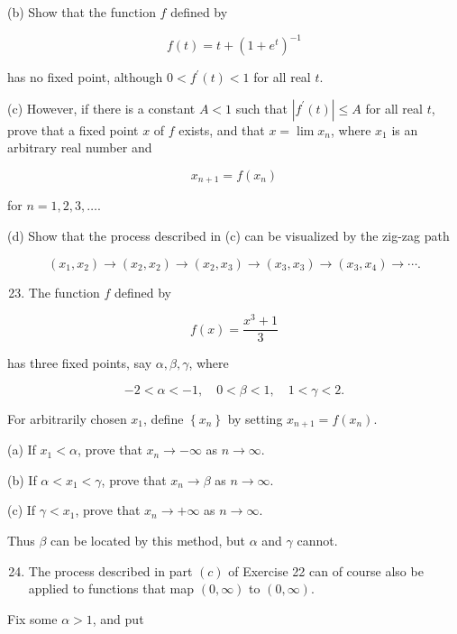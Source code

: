 \documentclass[10pt]{article}
\begin{document}
(b) Show that the function $f$ defined by

$$
f(t)=t+\left(1+e^{t}\right)^{-1}
$$

has no fixed point, although $0<f^{\prime}(t)<1$ for all real $t$.

(c) However, if there is a constant $A<1$ such that $\left|f^{\prime}(t)\right| \leq A$ for all real $t$, prove that a fixed point $x$ of $f$ exists, and that $x=\lim x_{n}$, where $x_{1}$ is an arbitrary real number and

$$
x_{n+1}=f\left(x_{n}\right)
$$

for $n=1,2,3, \ldots$.

(d) Show that the process described in (c) can be visualized by the zig-zag path

$$
\left(x_{1}, x_{2}\right) \rightarrow\left(x_{2}, x_{2}\right) \rightarrow\left(x_{2}, x_{3}\right) \rightarrow\left(x_{3}, x_{3}\right) \rightarrow\left(x_{3}, x_{4}\right) \rightarrow \cdots .
$$

\begin{enumerate}
  \setcounter{enumi}{22}
  \item The function $f$ defined by
\end{enumerate}

$$
f(x)=\frac{x^{3}+1}{3}
$$

has three fixed points, say $\alpha, \beta, \gamma$, where

$$
-2<\alpha<-1, \quad 0<\beta<1, \quad 1<\gamma<2 .
$$

For arbitrarily chosen $x_{1}$, define $\left\{x_{n}\right\}$ by setting $x_{n+1}=f\left(x_{n}\right)$.

(a) If $x_{1}<\alpha$, prove that $x_{n} \rightarrow-\infty$ as $n \rightarrow \infty$.

(b) If $\alpha<x_{1}<\gamma$, prove that $x_{n} \rightarrow \beta$ as $n \rightarrow \infty$.

(c) If $\gamma<x_{1}$, prove that $x_{n} \rightarrow+\infty$ as $n \rightarrow \infty$.

Thus $\beta$ can be located by this method, but $\alpha$ and $\gamma$ cannot.

\begin{enumerate}
  \setcounter{enumi}{23}
  \item The process described in part $(c)$ of Exercise 22 can of course also be applied to functions that map $(0, \infty)$ to $(0, \infty)$.
\end{enumerate}

Fix some $\alpha>1$, and put
\end{document}

